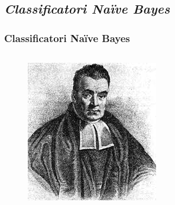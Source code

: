 \subsection[Classificatori Naïve Bayes]{\textit{Classificatori Naïve Bayes}}


\begin{frame}
	
	\frametitle{Classificatori Naïve Bayes}
	\begin{columns}
	
		\begin{figure}[!htbp]
			\centering
			\includegraphics[width=0.93\linewidth]{images/supervised/naive_bayes/thomas_bayes_1.jpg}
		\end{figure}
		
		
		

\end{columns}
\end{frame}
